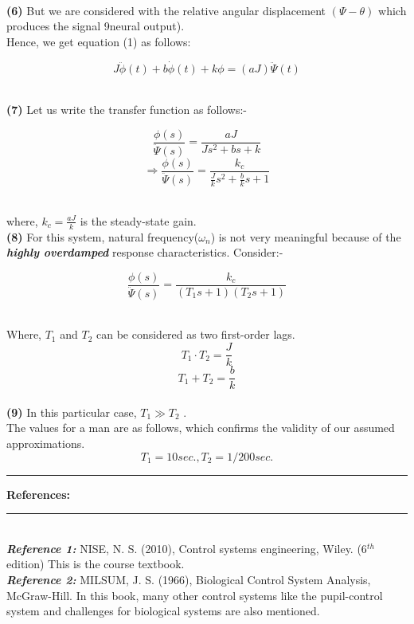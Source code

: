 \documentclass[15.7pt]{article}
\newcommand\question[2]{\vspace{.25in}\hrule\textbf{#1: #2}\vspace{.5em}\hrule\vspace{.10in}}
\renewcommand\part[1]{\vspace{.10in}\textbf{(#1)}}
\begin{document}
\\ \part{6} But we are considered with the relative angular displacement $(\Psi - \theta)$ which produces the signal 9neural output).
\\ Hence, we get equation (1) as follows:
\begin{center}
    \[ J\ddot \phi (t) + b\dot \phi (t) + k\phi = (aJ)\ddot\Psi (t) \]
\end{center}
\\ \part{7} Let us write the transfer function as follows:-
\begin{center}
     \[{ \frac{\phi(s)}{\ddot \Psi(s)} = \frac{aJ}{Js^{2} + bs +k} } \]
    \[\Rightarrow\boxed{ \frac{\phi(s)}{\ddot \Psi(s)} = \frac{ k_{c} }{\frac{J}{k} s^{2} + \frac{b}{k} s + 1} } \]
\end{center}
\\ where, \(k_{c}= \frac{aJ}{k} \) is the steady-state gain.
\\ \part{8} For this system, natural frequency($ \omega_{n} $) is not very meaningful because of the \textbf{\textit{highly overdamped}} response characteristics. Consider:-
\begin{center}
    \[\boxed{ \frac{\phi(s)}{\ddot \Psi(s)} = \frac{ k_{c} }{(T_{1}s +1)(T_{2}s +1)} } \]
\end{center}
\\ Where, $T_{1}$ and $T_{2}$ can be considered as two first-order lags.
\begin{equation}
    T_{1} \cdot T_{2}= \frac{J}{k}
\end{equation}
\begin{equation}
    T_{1} + T_{2}= \frac{b}{k}
\end{equation}
\\ \part{9} In this particular case, $T_{1} \gg T_{2}$ .
\\The values for a man are as follows, which confirms the validity of our assumed approximations.
\[\boxed{T_{1}= 10 sec. , T_{2} = 1/200 sec. } \]
\question{References}
\smallskip
\\ \textbf{\textit{Reference 1:}} NISE, N. S. (2010), Control systems engineering, Wiley. (6$^{th}$ edition)
This is the course textbook.
\\ \textbf{\textit{Reference 2:}} MILSUM, J. S. (1966), Biological Control System Analysis, McGraw-Hill.
In this book, many other control systems like the pupil-control system and challenges for biological systems are also mentioned.
\end{document}
